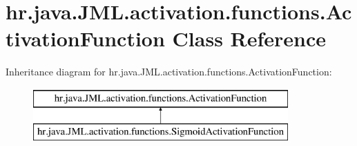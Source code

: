 \hypertarget{classhr_1_1java_1_1_j_m_l_1_1activation_1_1functions_1_1_activation_function}{\section{hr.\+java.\+J\+M\+L.\+activation.\+functions.\+Activation\+Function Class Reference}
\label{classhr_1_1java_1_1_j_m_l_1_1activation_1_1functions_1_1_activation_function}
}
Inheritance diagram for hr.\+java.\+J\+M\+L.\+activation.\+functions.\+Activation\+Function\+:\begin{figure}[H]
\begin{center}
\leavevmode
\includegraphics[height=2.000000cm]{classhr_1_1java_1_1_j_m_l_1_1activation_1_1functions_1_1_activation_function}
\end{center}
\end{figure}
